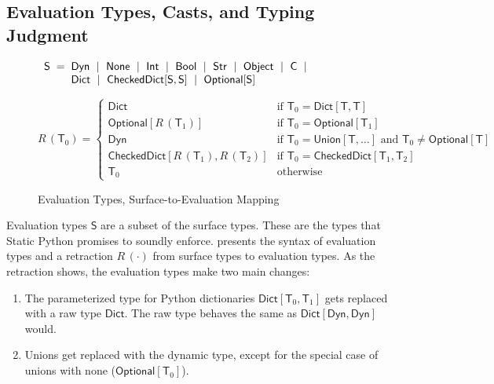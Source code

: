 \documentclass[english,cleveref,submission]{programming}
\makeatletter
\newcommand{\SP}{Static Python}
\newcommand{\defeq}{=}
\newcommand{\mfeq}{=}
\newcommand{\langmid}{~\mid~} %
\newenvironment{langarray}{\(\begin{array}{l@{\hspace{2mm}}c@{\hspace{2mm}}l}}{\end{array}\)}
\newcommand{\typefont}[1]{\mathsf{#1}}
\newcommand{\paramtype}[2]{#1[#2]}
\newcommand{\sptype}{\typefont{T}}
\newcommand{\spteval}{\typefont{S}}
\newcommand{\sptclass}{\typefont{C}}
\newcommand{\sptint}{\typefont{Int}}
\newcommand{\sptstr}{\typefont{Str}}
\newcommand{\sptbool}{\typefont{Bool}}
\newcommand{\sptdyn}{\typefont{Dyn}}
\newcommand{\sptobject}{\typefont{Object}}
\newcommand{\sptnone}{\typefont{None}}
\newcommand{\sptoptional}[1]{\paramtype{\typefont{Optional}}{#1}}
\newcommand{\sptunion}[1]{\paramtype{\typefont{Union}}{#1}}
\newcommand{\sptrawpydict}{\typefont{Dict}}
\newcommand{\sptrawchkdict}{\typefont{CheckedDict}} %
\newcommand{\sptpydict}[2]{\paramtype{\sptrawpydict}{#1, #2}}
\newcommand{\sptchkdict}[2]{\paramtype{\sptrawchkdict}{#1, #2}}
\newcommand{\mfapply}[2]{#1\,(#2)}
\newcommand{\mffont}[1]{\mathit{#1}}
\newcommand{\mftypeF}[1]{\mfapply{\mffont{R}}{#1}} %
\makeatother
\begin{document}
\subsection{Evaluation Types, Casts, and Typing Judgment}
\label{s:eval-types}

\begin{figure}[t]
  \begin{langarray}
    \spteval & \defeq &
      \sptdyn \langmid
      \sptnone \langmid
      \sptint \langmid
      \sptbool \langmid
      \sptstr \langmid
      \sptobject \langmid
      \sptclass \langmid
    \\ & &
      \sptrawpydict \langmid
      \sptchkdict{\spteval}{\spteval} \langmid
      \sptoptional{\spteval}
  \end{langarray}

  \bigskip
  \(
    \mftypeF{\sptype_0}
    \mfeq
    \left\{\begin{array}{ll}
      \sptrawpydict & \mbox{if $\sptype_0 = \sptpydict{\sptype}{\sptype}$}
    \\
      \sptoptional{\mftypeF{\sptype_1}} & \mbox{if $\sptype_0 = \sptoptional{\sptype_1}$}
    \\
      \sptdyn & \mbox{if $\sptype_0 = \sptunion{\sptype, \ldots}$ and $\sptype_0 \neq \sptoptional{\sptype}\!\!\!\!$}
    \\
      \sptchkdict{\mftypeF{\sptype_1}}{\mftypeF{\sptype_2}} & \mbox{if $\sptype_0 = \sptchkdict{\sptype_1}{\sptype_2}$}
    \\
      \sptype_0 & \mbox{otherwise}
    \end{array}\right.
  \)

  \caption{Evaluation Types, Surface-to-Evaluation Mapping}
  \label{f:surface-to-eval-types}
\end{figure}

Evaluation types $\spteval$ are a subset of the surface types.
These are the types that \SP{} promises to soundly enforce.
 presents the syntax of evaluation types
and a retraction $\mftypeF{\cdot}$ from surface types to evaluation types.
As the retraction shows, the evaluation types make two main changes:
\begin{enumerate}
  \item
    The parameterized type for Python dictionaries
    $\sptpydict{\sptype_0}{\sptype_1}$ gets replaced with
    a raw type $\sptrawpydict$.
    The raw type behaves the same as $\sptpydict{\sptdyn}{\sptdyn}$ would.
  \item
    Unions get replaced with the dynamic type, except for the special case
    of unions with none ($\sptoptional{\sptype_0}$).
\end{enumerate}
\end{document}
